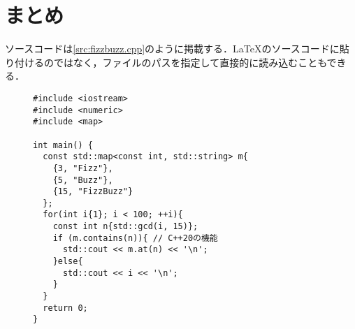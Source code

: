 \section{まとめ}\label{sec:まとめ}

ソースコードは\autoref{src:fizzbuzz.cpp}のように掲載する．\LaTeX{}のソースコードに貼り付けるのではなく，ファイルのパスを指定して直接的に読み込むこともできる．

\begin{figure}[!tb]
	\begin{lstlisting}[caption=ソースコードの掲載例, label=src:fizzbuzz.cpp, basicstyle=\ttfamily\scriptsize,escapechar=@]
#include <iostream>
#include <numeric>
#include <map>

int main() {
  const std::map<const int, std::string> m{
    {3, "Fizz"},
    {5, "Buzz"},
    {15, "FizzBuzz"}
  };
  for(int i{1}; i < 100; ++i){
    const int n{std::gcd(i, 15)};
    if (m.contains(n)){ // C++20の機能
      std::cout << m.at(n) << '\n';
    }else{
      std::cout << i << '\n';
    }
  }
  return 0;
}
	\end{lstlisting}
\end{figure}
